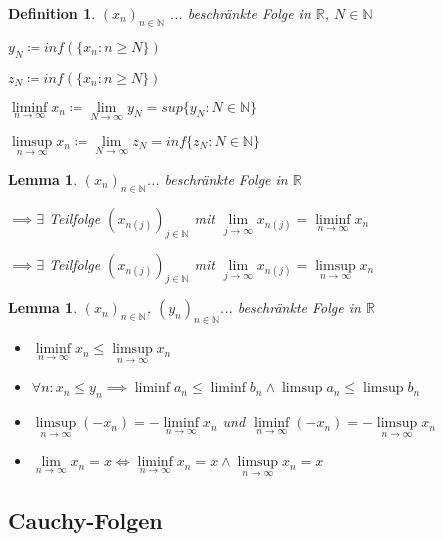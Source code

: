 \documentclass[twocolumn]{article}
\newtheorem{lemma}[theorem]{Lemma}
\newtheorem{definition}{Definition}[section]
\newcommand*{\logeq}{\Leftrightarrow}
\begin{document}
\begin{definition}
	$(x_n)_{n \in \mathbb{N}}$ ... beschränkte Folge in $\mathbb{R}$, $N \in \mathbb{N}$
	
	$y_N \coloneqq inf(\{x_n : n \geq N\})$
	
	$z_N \coloneqq inf(\{x_n : n \geq N\})$
	
	$\liminf\limits_{n \rightarrow \infty}x_n\coloneqq \lim\limits_{N \rightarrow \infty}y_N = sup\{y_N : N \in \mathbb{N}\}$
	
	$\limsup\limits_{n \rightarrow \infty}x_n\coloneqq \lim\limits_{N \rightarrow \infty}z_N = inf\{z_N : N \in \mathbb{N}\}$
\end{definition}

\begin{lemma}
	$(x_n)_{n \in \mathbb{N}}$... beschränkte Folge in $\mathbb{R}$
	
	$\implies \exists$ Teilfolge $(x_{n(j)})_{j \in \mathbb{N}}$ mit $\lim\limits_{j \rightarrow \infty}x_{n(j)}=\liminf\limits_{n \rightarrow \infty}x_n$
	
	$\implies \exists$ Teilfolge $(x_{n(j)})_{j \in \mathbb{N}}$ mit $\lim\limits_{j \rightarrow \infty}x_{n(j)}=\limsup\limits_{n \rightarrow \infty}x_n$
\end{lemma}

\begin{lemma}
	$(x_n)_{n \in \mathbb{N}}$, $(y_n)_{n \in \mathbb{N}}$... beschränkte Folge in $\mathbb{R}$
	
	\begin{itemize}
		\item $\liminf\limits_{n \rightarrow \infty}x_n \leq \limsup\limits_{n \rightarrow \infty}x_n$
		\item $\forall n : x_n \leq y_n \implies \liminf a_n \leq \liminf b_n \land \limsup a_n \leq \limsup b_n$
		\item $\limsup\limits_{n \rightarrow \infty}(-x_n)=-\liminf\limits_{n \rightarrow \infty}x_n$ und $\liminf\limits_{n \rightarrow \infty}(-x_n)=-\limsup\limits_{n \rightarrow \infty}x_n$
		\item $\lim\limits_{n \rightarrow \infty}x_n=x \logeq \liminf\limits_{n \rightarrow \infty}x_n = x \land \limsup\limits_{n \rightarrow \infty}x_n = x$
	\end{itemize}
\end{lemma}

\subsection{Cauchy-Folgen}
\end{document}
